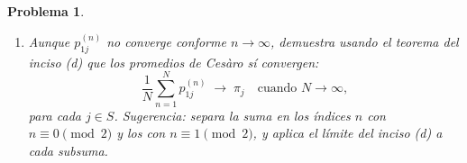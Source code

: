 \documentclass[12pt]{article}
\newtheorem{problem}{Problema}
\begin{document}
\begin{problem}
\begin{enumerate}
    \item[(f)] Aunque $p_{1j}^{(n)}$ no converge conforme $n\to\infty$, demuestra usando el teorema del inciso (d) que los promedios de Cesàro sí convergen:
    \[
        \frac{1}{N}\sum_{n=1}^{N} p_{1j}^{(n)} \;\longrightarrow\; \pi_j \quad \text{cuando } N \to \infty,
    \]
    para cada $j \in S$. \emph{Sugerencia: separa la suma en los índices $n$ con $n \equiv 0 \pmod{2}$ y los con $n \equiv 1 \pmod{2}$, y aplica el límite del inciso (d) a cada subsuma.}
\end{enumerate}
\end{problem}
\end{document}
